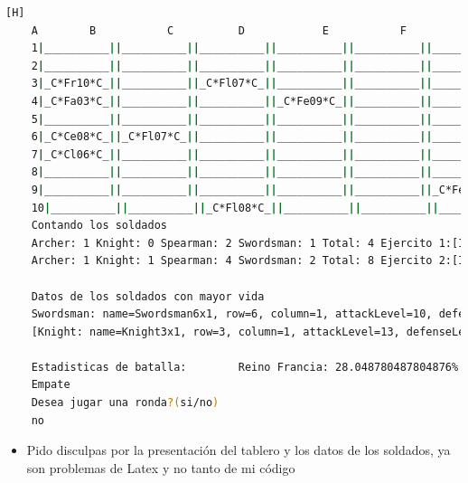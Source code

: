 \documentclass{article}
\begin{document}
\begin{lstlisting}[language=bash,caption={Compilando y probando todo el juego }][H]
	A        B           C          D            E           F             G            H           I             J 
	1|__________||__________||__________||__________||__________||__________||__________||__________||__________||__________|
	2|__________||__________||__________||__________||__________||__________||__________||__________||__________||__________|
	3|_C*Fr10*C_||__________||_C*Fl07*C_||__________||__________||__________||__________||__________||__________||__________|
	4|_C*Fa03*C_||__________||__________||_C*Fe09*C_||__________||__________||__________||_C*Ca03*C_||__________||__________|
	5|__________||__________||__________||__________||__________||__________||__________||__________||__________||__________|
	6|_C*Ce08*C_||_C*Fl07*C_||__________||__________||__________||__________||__________||__________||__________||__________|
	7|_C*Cl06*C_||__________||__________||__________||__________||__________||__________||__________||__________||__________|
	8|__________||__________||__________||__________||__________||__________||__________||__________||_C*Cl06*C_||__________|
	9|__________||__________||__________||__________||__________||_C*Fe09*C_||__________||__________||__________||_C*Fl06*C_|
	10|__________||__________||_C*Fl08*C_||__________||__________||__________||__________||__________||__________||__________|
	Contando los soldados
	Archer: 1 Knight: 0 Spearman: 2 Swordsman: 1 Total: 4 Ejercito 1:[I@41906a77
	Archer: 1 Knight: 1 Spearman: 4 Swordsman: 2 Total: 8 Ejercito 2:[I@4b9af9a9
	
	Datos de los soldados con mayor vida
	Swordsman: name=Swordsman6x1, row=6, column=1, attackLevel=10, defenseLevel=8, actualLife=8, speed=0, attitude=Repose, current=true, longSnow=1.0, shieldWalls=false]
	[Knight: name=Knight3x1, row=3, column=1, attackLevel=13, defenseLevel=7, actualLife=10, speed=0, attitude=Repose, current=true, currentWeapon=sword, horseRiding=false]
	
	Estadisticas de batalla:        Reino Francia: 28.048780487804876%      Reino Castilla: 71.95121951219512%      Salio como aleatorio: 97%
	Empate
	Desea jugar una ronda?(si/no)
	no
	\end{lstlisting}
	
	\begin{itemize}	
		\item Pido disculpas por la presentación del tablero y los datos de los soldados, ya son problemas de Latex y no tanto de mi código 
	\end{itemize}
\end{document}

